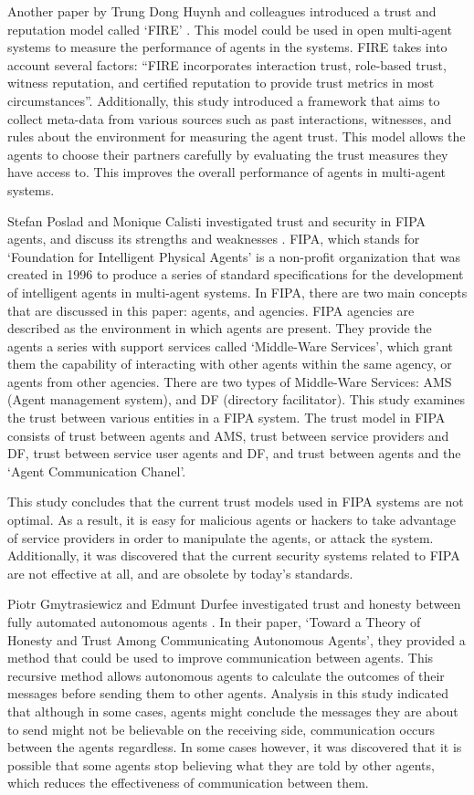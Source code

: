 \documentclass[runningheads,a4paper]{llncs}
\begin{document}
Another paper by Trung Dong Huynh and colleagues introduced a trust and reputation model called `FIRE' \cite{huynh2006integrated}. This model could be used in open multi-agent systems to measure the performance of agents in the systems. FIRE takes into account several factors: ``FIRE incorporates interaction trust,
role-based trust, witness reputation, and certified reputation to provide trust metrics in most
circumstances''. Additionally, this study introduced a framework that aims to collect meta-data from various sources such as past interactions, witnesses, and rules about the environment for measuring the agent trust. This model allows the agents to choose their partners carefully by evaluating the trust measures they have access to. This improves the overall performance of agents in multi-agent systems.

Stefan Poslad and Monique Calisti investigated trust and security in FIPA agents, and discuss its strengths and weaknesses \cite{poslad2000towards}. FIPA, which stands for `Foundation for Intelligent Physical Agents' is a non-profit organization that was created in 1996 to produce a series of standard specifications for the development of intelligent agents in multi-agent systems. In FIPA, there are two main concepts that are discussed in this paper: agents, and agencies. FIPA agencies are described as the environment in which agents are present. They provide the agents a series with support services called `Middle-Ware Services', which grant them the capability of interacting with other agents within the same agency, or agents from other agencies. There are two types of Middle-Ware Services: AMS (Agent management system), and DF (directory facilitator). This study examines the trust between various entities in a FIPA system. The trust model in FIPA consists of trust between agents and AMS, trust between service providers and DF, trust between service user agents and DF, and trust between agents and the `Agent Communication Chanel'. 

This study concludes that the current trust models used in FIPA systems are not optimal. As a result, it is easy for malicious agents or hackers to take advantage of service providers in order to manipulate the agents, or attack the system. Additionally, it was discovered that the current security systems related to FIPA are not effective at all, and are obsolete by today's standards.


Piotr Gmytrasiewicz and Edmunt Durfee investigated trust and honesty between fully automated autonomous agents \cite{gmytrasiewicz1993toward}. In their paper, `Toward a Theory of Honesty and Trust Among
Communicating Autonomous Agents', they provided a method that could be used to improve communication between agents. This recursive method allows autonomous agents to calculate the outcomes of their messages before sending them to other agents. Analysis in this study indicated that although in some cases, agents might conclude the messages they are about to send might not be believable on the receiving side, communication occurs between the agents regardless. In some cases however, it was discovered that it is possible that some agents stop believing what they are told by other agents, which reduces the effectiveness of communication between them.
\end{document}
